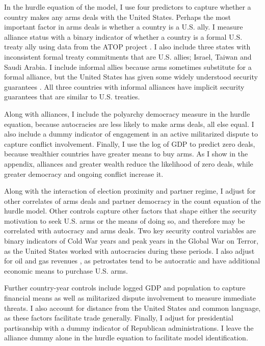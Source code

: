 \documentclass[12pt]{article}
\begin{document}
In the hurdle equation of the model, I use four predictors to capture whether a country makes any arms deals with the United States. 
Perhaps the most important factor in arms deals is whether a country is a U.S. ally. 
I measure alliance status with a binary indicator of whether a country is a formal U.S. treaty ally using data from the ATOP project \citep{Leedsetal2002}.
I also include three states with inconsistent formal treaty commitments that are U.S. allies; Israel, Taiwan and Saudi Arabia. 
I include informal allies because arms sometimes substitute for a formal alliance, but the United States has given some widely understood security guarantees \citep{Yarhi-Miloetal2016}. 
All three countries with informal alliances have implicit security guarantees that are similar to U.S. treaties. 


Along with alliances, I include the polyarchy democracy measure in the hurdle equation, because autocracies are less likely to make arms deals, all else equal. 
I also include a dummy indicator of engagement in an active militarized dispute to capture conflict involvement. 
Finally, I use the log of GDP to predict zero deals, because wealthier countries have greater means to buy arms.
As I show in the appendix, alliances and greater wealth reduce the likelihood of zero deals, while greater democracy and ongoing conflict increase it. 


Along with the interaction of election proximity and partner regime, I adjust for other correlates of arms deals and partner democracy in the count equation of the hurdle model. 
Other controls capture other factors that shape either the security motivation to seek U.S. arms or the means of doing so, and therefore may be correlated with autocracy and arms deals. 
Two key security control variables are binary indicators of Cold War years and peak years in the Global War on Terror, as the United States worked with autocracies during these periods. 
I also adjust for oil and gas revenues \citep{RossMahdavi2015}, as petrostates tend to be autocratic and have additional economic means to purchase U.S. arms.


Further country-year controls include logged GDP and population to capture financial means as well as militarized dispute involvement to measure immediate threats.
I also account for distance from the United States and common language, as these factors facilitate trade generally. 
Finally, I adjust for presidential partisanship with a dummy indicator of Republican administrations.  
I leave the alliance dummy alone in the hurdle equation to facilitate model identification.
\end{document}
